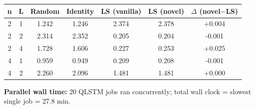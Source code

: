 \begin{center}
\small
\begin{tabular}{@{}cc|cccc|c@{}}
\toprule
\textbf{n} & \textbf{L} & \textbf{Random} & \textbf{Identity} & \textbf{LS (vanilla)} & \textbf{LS (novel)} & \textbf{$\Delta$ (novel$-$LS)} \\
\midrule
2 & 1 & 1.242 & 1.246 & 2.374 & 2.378 & +0.004 \\
2 & 2 & 2.314 & 2.352 & 0.205 & 0.204 & -0.001 \\
2 & 4 & 1.728 & 1.606 & 0.227 & 0.253 & +0.025 \\
4 & 1 & 0.959 & 0.949 & 0.209 & 0.208 & -0.001 \\
4 & 2 & 2.260 & 2.096 & 1.481 & 1.481 & +0.000 \\
\bottomrule
\end{tabular}
\end{center}

\noindent\textbf{Parallel wall time:} 20 QLSTM jobs ran concurrently; total wall clock = slowest single job = 27.8 min.
